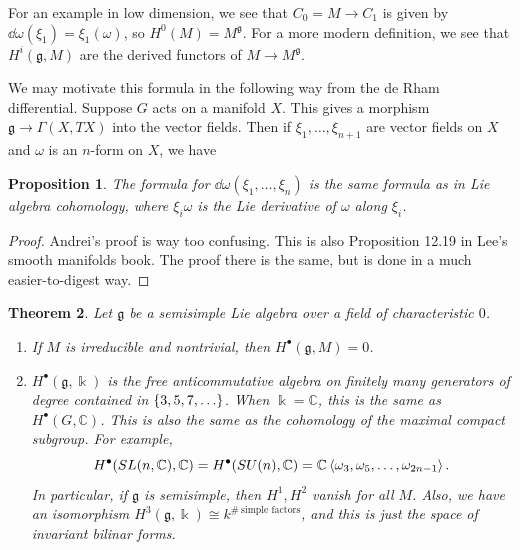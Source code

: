 \documentclass[leqno, openany]{memoir}
\newtheorem{thm}{Theorem}[section]
\newtheorem{prop}[thm]{Proposition}
\theoremstyle{definition}
\theoremstyle{remark}
\theoremstyle{plain}
\theoremstyle{definition}
\theoremstyle{remark}
\newcommand{\C}{\mathbb{C}}
\renewcommand{\k}{\Bbbk}
\newcommand{\mf}[1]{\mathfrak{#1}}
\begin{document}
For an example in low dimension, we see that $C_0 = M \to C_1$ is given by $\dd{\omega} (\xi_1) = \xi_1 (\omega)$, so $H^0(M) = M^{\mf{g}}$. For a more modern definition, we see that $H^i(\mf{g}, M)$ are the derived functors of $M \to M^{\mf{g}}$.

We may motivate this formula in the following way from the de Rham differential. Suppose $G$ acts on a manifold $X$. This gives a morphism $\mf{g} \to \Gamma(X, TX)$ into the vector fields. Then if $\xi_1, \ldots, \xi_{n+1}$ are vector fields on $X$ and $\omega$ is an $n$-form on $X$, we have
\begin{prop}
    The formula for $\dd{\omega} (\xi_1, \ldots, \xi_n)$ is the same formula as in Lie algebra cohomology, where $\xi_i \omega$ is the Lie derivative of $\omega$ along $\xi_i$.
\end{prop}

\begin{proof}
    Andrei's proof is way too confusing. This is also Proposition 12.19 in Lee's smooth manifolds book. The proof there is the same, but is done in a much easier-to-digest way.
\end{proof}

\begin{thm}
    Let $\mf{g}$ be a semisimple Lie algebra over a field of characteristic $0$.
    \begin{enumerate}
        \item If $M$ is irreducible and nontrivial, then $H^{\bullet}(\mf{g}, M) = 0$.
        \item $H^{\bullet}(\mf{g}, \k)$ is the free anticommutative algebra on finitely many generators of degree contained in $\qty{3, 5, 7, \ldots}$. When $\k = \C$, this is the same as $H^{\bullet}(G, \C)$. This is also the same as the cohomology of the maximal compact subgroup. For example, 
            \[ H^{\bullet}(SL(n, \C), \C) = H^{\bullet}(SU(n), \C) = \C\ev{\omega_3, \omega_5, \ldots, \omega_{2n-1}}. \]
            In particular, if $\mf{g}$ is semisimple, then $H^{1}, H^2$ vanish for all $M$. Also, we have an isomorphism $H^3(\mf{g}, \k) \cong k^{\#\ \text{simple factors}}$, and this is just the space of invariant bilinar forms.
    \end{enumerate}
\end{thm}
\end{document}
